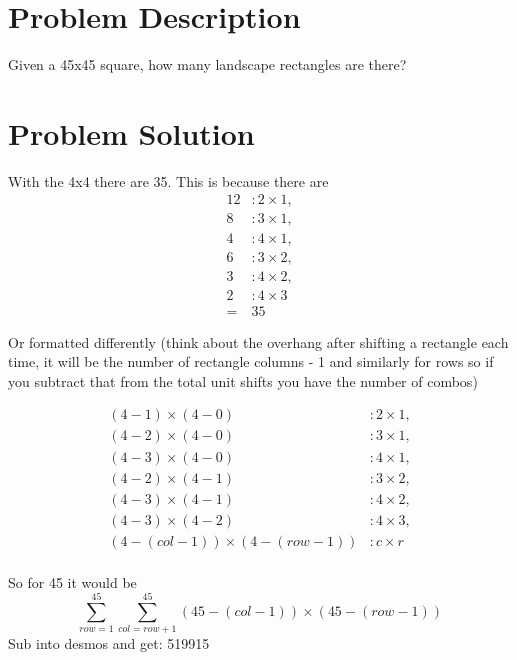 \documentclass{article}
\begin{document}
\section{Problem Description}
\huge
Given a 45x45 square, how many landscape rectangles are there?

\section{Problem Solution}
With the 4x4 there are 35. This is because there are 
\begin{align*}
    12&:2\times1,\\
    8&: 3\times1,\\
    4&: 4\times1,\\
    6&: 3\times2,\\
    3&: 4\times2,\\
    2&: 4\times3 \\
    =& 35
\end{align*}

Or formatted differently (think about the overhang after
shifting a rectangle each time, it will be the number of 
rectangle columns - 1 and similarly for rows so if you 
subtract that from the total unit shifts you have the number
of combos)

\begin{align*}
    (4-1) \times (4-0)&: 2\times1,\\
    (4-2) \times (4-0)&: 3\times1,\\
    (4-3) \times (4-0)&: 4\times1,\\
    (4-2) \times (4-1)&: 3\times2,\\
    (4-3) \times (4-1)&: 4\times2,\\
    (4-3) \times (4-2)&: 4\times3,\\
(4-(col-1)) \times (4-(row-1))&: c\times r\\
\end{align*}

So for 45 it would be 
\[
    \sum^{45}_{row=1} {\sum^{45}_{col=row+1}} 
        (45-(col-1)) \times (45-(row-1))
\]
Sub into desmos and get: 519915
\end{document}
